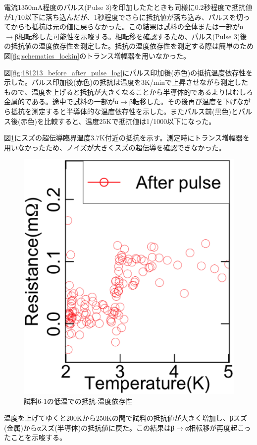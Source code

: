 電流1350mA程度のパルス(Pulse 3)を印加したたときも同様に0.2秒程度で抵抗値が1/10以下に落ち込んだが、1秒程度でさらに抵抗値が落ち込み、パルスを切ってからも抵抗は元の値に戻らなかった。この結果は試料の全体または一部がα$\to$β相転移した可能性を示唆する。相転移を確認するため、パルス(Pulse 3)後の抵抗値の温度依存性を測定した。抵抗の温度依存性を測定する際は簡単のため図\ref{fig:schematics_lockin}のトランス増幅器を用いなかった。

図\ref{fig:181213_before_after_pulse_log}にパルス印加後(赤色)の抵抗温度依存性を示した。パルス印加後(赤色)の抵抗は温度を3K/minで上昇させながら測定したもので、温度を上げると抵抗が大きくなることから半導体的であるよりはむしろ金属的である。途中で試料の一部がα$\to$β転移した。その後再び温度を下げながら抵抗を測定すると半導体的な温度依存性を示した。またパルス前(黒色)とパルス後(赤色)を比較すると、温度25Kで抵抗値は1/1000以下になった。%

図\ref{fig:181213_after_pulse2}にスズの超伝導臨界温度3.7K付近の抵抗を示す。測定時にトランス増幅器を用いなかったため、ノイズが大きくスズの超伝導を確認できなかった。
\begin{figure}[!h]
    \begin{center}
   \includegraphics[width=0.4\hsize]{results_discussions/after_pulse2.eps}
  \end{center}
  \caption{試料6-1の低温での抵抗-温度依存性}
  \label{fig:181213_after_pulse2}
  \end{figure}

温度を上げてゆくと200Kから250Kの間で試料の抵抗値が大きく増加し、βスズ(金属)からαスズ(半導体)の抵抗値に戻た。この結果はβ$\to$α相転移が再度起こったことを示唆する。

